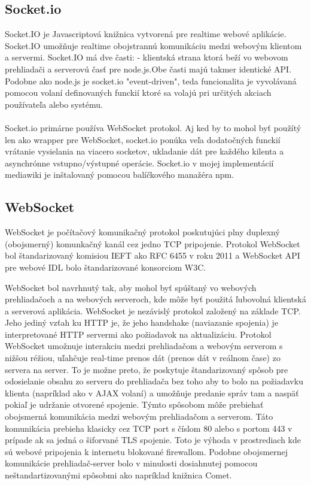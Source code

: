 \subsection{Socket.io}


Socket.IO je Javascriptová knižnica vytvorená pre realtime webové aplikácie. Socket.IO umožňuje realtime obojstrannú komunikáciu medzi webovým klientom a servermi. Socket.IO má dve časti:
- klientská strana ktorá beží vo webovom prehliadači a serverovú časť pre node.js.Obe časti majú takmer identické API. Podobne ako node.js je socket.io "event-driven", teda funcionalita je vyvolávaná pomocou volaní definovaných funckií ktoré sa volajú pri určitých akciach používateľa alebo systému.\\
\\
Socket.io primárne používa WebSocket protokol. Aj ked by to mohol byť použítý len ako wrapper pre WebSocket, socket.io ponúka veľa dodatočných funckií vrátanie vysielania na viacero socketov, ukladanie dát pre každého kilenta a asynchrónne vstupno/výstupné operácie.
Socket.io v mojej implementácií mediawiki je inštalovaný pomocou balíčkového manažéra npm.

\subsection{WebSocket}


WebSocket je počítačový komunikačný protokol poskutujúci plny duplexný (obojsmerný)  komunkačný kanál cez jedno TCP pripojenie.
Protokol WebSocket bol štandarizovaný komisiou IEFT ako RFC 6455 v roku 2011 a WebSocket API pre webové IDL bolo štandarizované konsorciom W3C.

WebSocket bol navrhnutý tak, aby mohol byť spúštaný vo webových prehliadačoch a na webových serveroch, kde môže byť použitá ľubovolná  klientská a serverová aplikácia. WebSocket je nezávislý protokol založený na základe TCP. Jeho jediný vzťah ku HTTP je, že jeho handshake (naviazanie spojenia) je interpretované HTTP servermi ako požiadavok na aktualizáciu. Protokol WebSocket umožnuje interakciu medzi prehliadačom a webovým serverom s nižšou réžiou, uľahčuje real-time prenos dát (prenos dát v reálnom čase) zo servera na server. To je možne preto, že poskytuje štandarizovaný spôsob pre odosielanie obsahu zo serveru do prehliadača bez toho aby to bolo na požiadavku klienta (napríklad ako v AJAX volaní) a umožňuje predanie správ tam a naspäť pokiaľ je udržanie otvorené spojenie. Týmto spôsobom môže prebiehať obojsmerná komunikácia medzi webovým prehliadačom a serverom. Táto komunikácia prebieha klasicky cez TCP port s číslom 80 alebo s portom 443 v prípade ak sa jedná o šiforvané TLS spojenie. Toto je výhoda v prostrediach kde sú webové pripojenia k internetu blokované firewallom. Podobne obojsmernej komunikácie prehliadač-server bolo v minulosti dosiahnutej pomocou neštandartizovanými spôsobmi ako napríklad knižnica Comet.

